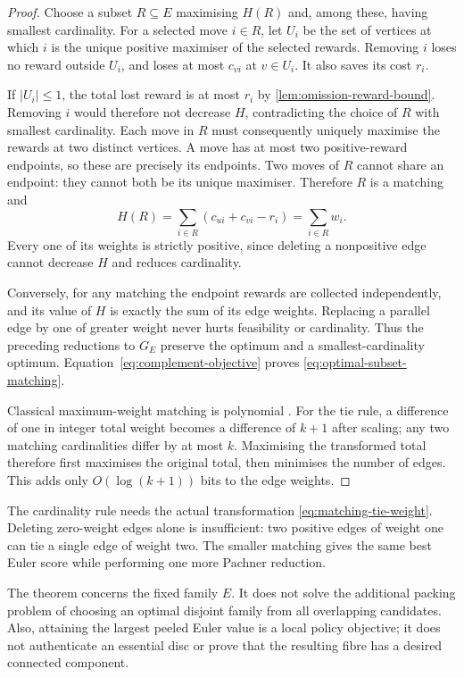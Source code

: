 \begin{proof}
Choose a subset $R\subseteq E$ maximising $H(R)$ and, among these,
having smallest cardinality. For a selected move $i\in R$, let
$U_i$ be the set of vertices at which $i$ is the unique positive
maximiser of the selected rewards. Removing $i$ loses no reward
outside $U_i$, and loses at most $c_{vi}$ at $v\in U_i$. It also
saves its cost $r_i$.

If $|U_i|\le1$, the total lost reward is at most $r_i$ by
\cref{lem:omission-reward-bound}. Removing $i$ would therefore not
decrease $H$, contradicting the choice of $R$ with smallest
cardinality. Each move in $R$ must consequently uniquely maximise
the rewards at two distinct vertices. A move has at most two
positive-reward endpoints, so these are precisely its endpoints.
Two moves of $R$ cannot share an endpoint: they cannot both be its
unique maximiser. Therefore $R$ is a matching and
\[
 H(R)=\sum_{i\in R}(c_{ui}+c_{vi}-r_i)=\sum_{i\in R}w_i.
\]
Every one of its weights is strictly positive, since deleting a
nonpositive edge cannot decrease $H$ and reduces cardinality.

Conversely, for any matching the endpoint rewards are collected
independently, and its value of $H$ is exactly the sum of its edge
weights. Replacing a parallel edge by one of greater weight never
hurts feasibility or cardinality. Thus the preceding reductions to
$G_E$ preserve the optimum and a smallest-cardinality optimum.
Equation~\eqref{eq:complement-objective} proves
\eqref{eq:optimal-subset-matching}.

Classical maximum-weight matching is polynomial
\cite{Edmonds1965}. For the tie rule, a difference of one in integer
total weight becomes a difference of $k+1$ after scaling; any two
matching cardinalities differ by at most $k$. Maximising the
transformed total therefore first maximises the original total,
then minimises the number of edges. This adds only $O(\log(k+1))$
bits to the edge weights.
\end{proof}

The cardinality rule needs the actual transformation
\eqref{eq:matching-tie-weight}. Deleting zero-weight edges alone is
insufficient: two positive edges of weight one can tie a single
edge of weight two. The smaller matching gives the same best Euler
score while performing one more Pachner reduction.

The theorem concerns the fixed family $E$. It does not solve the
additional packing problem of choosing an optimal disjoint family
from all overlapping candidates. Also, attaining the largest peeled
Euler value is a local policy objective; it does not authenticate
an essential disc or prove that the resulting fibre has a desired
connected component.

